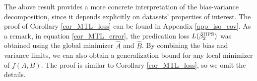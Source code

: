 

The above result provides a more concrete interpretation of the bias-variance decomposition, since it depends explicitly on datasets' properties of interest.
The proof of Corollary \ref{cor_MTL_loss} can be found in Appendix \ref{app_iso_cov}.
As a remark, in equation \eqref{cor_MTL_error}, the predication loss $L(\hat{\beta}_2^{\textup{HPS}}) $ was obtained using the global minimizer $\hat A$ and $\hat B$. By combining the bias and variance limits, we can also obtain a generalization bound for any local minimizer of $f(A, B)$.
The proof is similar to Corollary \ref{cor_MTL_loss}, so we omit the details.

